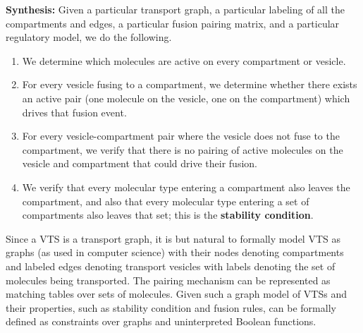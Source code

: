 \textbf{Synthesis:} Given a particular transport graph, a particular labeling of all the compartments and edges, a particular fusion pairing matrix, and a particular regulatory model, we do the following.

\begin{enumerate}
\item We determine which molecules are active on every compartment or vesicle.
\item For every vesicle fusing to a compartment, we determine whether there exists an active pair (one molecule on the vesicle, one on the compartment) which drives that fusion event.
\item For every vesicle-compartment pair where the vesicle does not fuse to the compartment, we verify that there is no pairing of active molecules on the
vesicle and compartment that could drive their fusion.
\item We verify that every molecular type entering a compartment also leaves the compartment, and also that every molecular type entering a set of compartments also leaves that set; this is the \textbf{stability condition}.
\end{enumerate}


\label{subsec:graphmodel}
%
Since a VTS is a transport graph, it is but natural to formally model
VTS as graphs (as used in computer science) with their nodes denoting
compartments and labeled edges denoting transport vesicles with labels
denoting the set of molecules being transported. The pairing mechanism
can be represented as matching tables over sets of molecules.
%
Given such a graph model of VTSs and their properties, such as
stability condition and fusion rules, can be formally defined as
constraints over graphs and uninterpreted Boolean functions.
%
\
   
